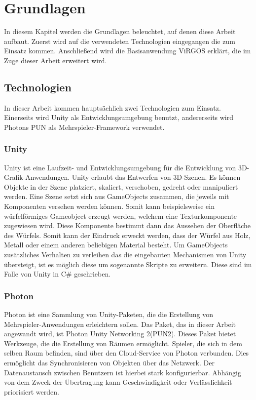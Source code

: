 \section{Grundlagen}
In diesem Kapitel werden die Grundlagen beleuchtet, auf denen diese Arbeit aufbaut. Zuerst wird auf die verwendeten Technologien eingegangen die zum Einsatz kommen. Anschließend wird die Basisanwendung ViRGOS erklärt, die im Zuge dieser Arbeit erweitert wird. 

\subsection{Technologien}

In dieser Arbeit kommen hauptsächlich zwei Technologien zum Einsatz. Einerseits wird Unity als Entwicklungsumgebung benutzt, andererseits wird Photons PUN als Mehrspieler-Framework verwendet. 

\subsubsection*{Unity}
Unity ist eine Laufzeit- und Entwicklungsumgebung für die Entwicklung von 3D-Grafik-Anwendungen. Unity erlaubt das Entwerfen von 3D-Szenen. Es können Objekte in der Szene platziert, skaliert, verschoben, gedreht oder manipuliert werden. Eine Szene setzt sich aus GameObjects zusammen, die jeweils mit Komponenten versehen werden können. Somit kann beispielsweise ein würfelförmiges Gameobject erzeugt werden, welchem eine Texturkomponente zugewiesen wird. Diese Komponente bestimmt dann das Aussehen der Oberfläche des Würfels. Somit kann der Eindruck erweckt werden, dass der Würfel aus Holz, Metall oder einem anderen beliebigen Material besteht. Um GameObjects zusätzliches Verhalten zu verleihen das die eingebauten Mechanismen von Unity übersteigt, ist es möglich diese um sogenannte Skripte zu erweitern. Diese sind im Falle von Unity in C\# geschrieben.

\subsubsection*{Photon}
Photon ist eine Sammlung von Unity-Paketen, die die Erstellung von Mehrspieler-Anwendungen erleichtern sollen. Das Paket, das in dieser Arbeit angewandt wird, ist \glqq Photon Unity Networking 2\grqq  (PUN2). Dieses Paket bietet Werkzeuge, die die Erstellung von Räumen ermöglicht. Spieler, die sich in dem selben Raum befinden, sind über den Cloud-Service von Photon verbunden. Dies ermöglicht das Synchronisieren von Objekten über das Netzwerk. Der Datenaustausch zwischen Benutzern ist hierbei stark konfigurierbar. Abhängig von dem Zweck der Übertragung kann Geschwindigkeit oder Verlässlichkeit priorisiert werden.

